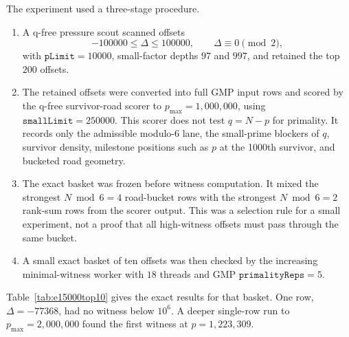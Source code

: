 \documentclass[11pt]{article}
\begin{document}
The experiment used a three-stage procedure.
\begin{enumerate}
\item A q-free pressure scout scanned offsets
  \[
    -100000\le\Delta\le100000,\qquad \Delta\equiv0\pmod2,
  \]
  with \(\texttt{pLimit}=10000\), small-factor depths \(97\) and \(997\), and
  retained the top \(200\) offsets.
\item The retained offsets were converted into full GMP input rows and scored
  by the q-free survivor-road scorer to \(p_{\max}=1{,}000{,}000\), using
  \(\texttt{smallLimit}=250000\). This scorer does not test \(q=N-p\) for
  primality. It records only the admissible modulo-\(6\) lane, the
  small-prime blockers of \(q\), survivor density, milestone positions such
  as \(p\) at the 1000th survivor, and bucketed road geometry.
\item The exact basket was frozen before witness computation. It mixed the
  strongest \(N\bmod6=4\) road-bucket rows with the strongest \(N\bmod6=2\)
  rank-sum rows from the scorer output. This was a selection rule for a small
  experiment, not a proof that all high-witness offsets must pass through the
  same bucket.
\item A small exact basket of ten offsets was then checked by the
  increasing minimal-witness worker with \(18\) threads and GMP
  \(\texttt{primalityReps}=5\).
\end{enumerate}

Table~\ref{tab:e15000top10} gives the exact results for that basket. One row,
\(\Delta=-77368\), had no witness below \(10^6\). A deeper single-row run to
\(p_{\max}=2{,}000{,}000\) found the first witness at \(p=1{,}223{,}309\).
\end{document}

